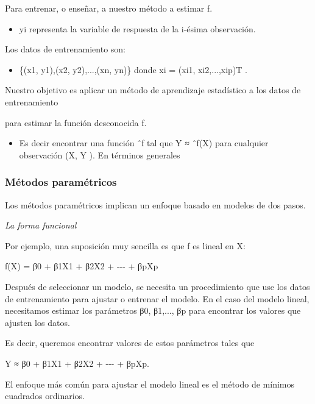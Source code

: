 \documentclass[
  letterpaper,
  DIV=11,
  numbers=noendperiod]{scrartcl}
\providecommand{\tightlist}{%
  \setlength{\itemsep}{0pt}\setlength{\parskip}{0pt}}\usepackage{longtable,booktabs,array}
\begin{document}
Para entrenar, o enseñar, a nuestro método a estimar f.

\begin{itemize}
\tightlist
\item
  yi representa la variable de respuesta de la i-ésima observación.
\end{itemize}

Los datos de entrenamiento son:

\begin{itemize}
\tightlist
\item
  \{(x1, y1),(x2, y2),...,(xn, yn)\} donde xi = (xi1, xi2,...,xip)T .
\end{itemize}

Nuestro objetivo es aplicar un método de aprendizaje estadístico a los
datos de entrenamiento

para estimar la función desconocida f.

\begin{itemize}
\tightlist
\item
  Es decir encontrar una función ˆf tal que Y ≈ ˆf(X) para cualquier
  observación (X, Y ). En términos generales
\end{itemize}

\hypertarget{muxe9todos-paramuxe9tricos}{%
\subsubsection{\texorpdfstring{\textbf{Métodos
paramétricos}}{Métodos paramétricos}}\label{muxe9todos-paramuxe9tricos}}

Los métodos paramétricos implican un enfoque basado en modelos de dos
pasos.

\emph{La forma funcional}

Por ejemplo, una suposición muy sencilla es que f es lineal en X:

f(X) = β0 + β1X1 + β2X2 + -\/-\/- + βpXp

Después de seleccionar un modelo, se necesita un procedimiento que use
los datos de entrenamiento para ajustar o entrenar el modelo. En el caso
del modelo lineal, necesitamos estimar los parámetros β0, β1,..., βp
para encontrar los valores que ajusten los datos.

Es decir, queremos encontrar valores de estos parámetros tales que

Y ≈ β0 + β1X1 + β2X2 + -\/-\/- + βpXp.

El enfoque más común para ajustar el modelo lineal es el método de
mínimos cuadrados ordinarios.
\end{document}
